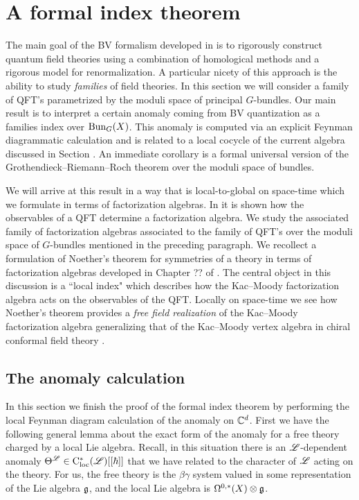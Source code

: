 \section{A formal index theorem}

The main goal of the BV formalism developed in \cite{CosBook} is to rigorously construct quantum field theories using a combination of homological methods and a rigorous model for renormalization. 
A particular nicety of this approach is the ability to study {\em families} of field theories. 
In this section we will consider a family of QFT's parametrized by the moduli space of principal $G$-bundles. 
Our main result is to interpret a certain anomaly coming from BV quantization as a families index over ${\rm Bun}_G(X)$. 
This anomaly is computed via an explicit Feynman diagrammatic calculation and is related to a local cocycle of the current algebra discussed in Section . 
An immediate corollary is a formal universal version of the Grothendieck--Riemann--Roch theorem over the moduli space of bundles. 

We will arrive at this result in a way that is local-to-global on space-time which we formulate in terms of factorization algebras.
In \cite{CG1, CG2} it is shown how the observables of a QFT determine a factorization algebra. 
We study the associated family of factorization algebras associated to the family of QFT's over the moduli space of $G$-bundles mentioned in the preceding paragraph. 
We recollect a formulation of Noether's theorem for symmetries of a theory in terms of factorization algebras developed in Chapter ?? of \cite{CG2}. 
The central object in this discussion is a ``local index" which describes how the Kac--Moody factorization algebra acts on the observables of the QFT. 
Locally on space-time we see how Noether's theorem provides a {\em free field realization} of the Kac--Moody factorization algebra generalizing that of the Kac--Moody vertex algebra in chiral conformal field theory \cite{??}. 

\subsection{The anomaly calculation}

In this section we finish the proof of the formal index theorem by performing the local Feynman diagram calculation of the anomaly on $\mathbb C^d$. 
First we have the following general lemma about the exact form of the anomaly for a free theory charged by a local Lie algebra. 
Recall, in this situation there is an $\mathscr L$-dependent anomaly $\Theta^\mathscr L \in {\rm C}_{\rm loc}^*(\mathscr L)[[\hbar]]$ that we have related to the character of $\mathscr L$ acting on the theory. 
For us, the free theory is the $\beta\gamma$ system valued in some representation of the Lie algebra $\mathfrak g$, and the local Lie algebra is $\Omega^{0,*}(X) \otimes \mathfrak g$. 

